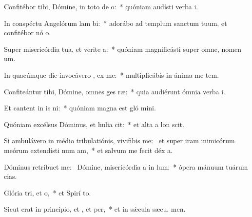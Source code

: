 \item Confitébor tibi, Dómine, in toto de o:~* quóniam audísti verba  i.
\item In conspéctu Angelórum lam bi:~* adorábo ad templum sanctum tuum, et confitébor nó o.
\item Super misericórdia tua, et verite a:~* quóniam magnificásti super omne, nomen  um.
\item In quacúmque die invocávero , ex me:~* multiplicábis in ánima me tem.
\item Confiteántur tibi, Dómine, omnes ges ræ:~* quia audiérunt ómnia verba  i.
\item Et cantent in is ni:~* quóniam magna est gló mini.
\item Quóniam excélsus Dóminus, et hulia cit:~* et alta a lon scit.
\item Si ambulávero in médio tribulatiónis, vivifibis me:~\pscross{} et super iram inimicórum meórum extendísti num am,~* et salvum me fecit déx a.
\item Dóminus retríbuet  me:~\pscross{} Dómine, misericórdia a in lum:~* ópera mánuum tuárum  cias.
\item Glória tri, et o,~* et Spirí to.
\item Sicut erat in princípio, et , et per,~* et in sǽcula sæcu. men.
